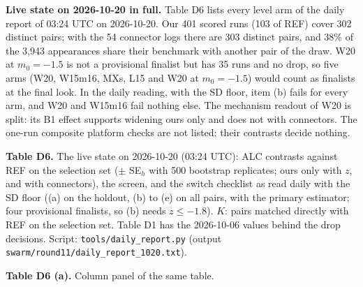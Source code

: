 \documentclass[
]{article}
\begin{document}
\textbf{Live state on 2026-10-20 in full.} Table D6 lists every level
arm of the daily report of 03:24 UTC on 2026-10-20. Our 401 scored runs
(103 of REF) cover 302 distinct pairs; with the 54 connector logs there
are 303 distinct pairs, and 38\% of the 3,943 appearances share their
benchmark with another pair of the draw. W20 at \(m_0 = -1.5\) is not a
provisional finalist but has 35 runs and no drop, so five arms (W20,
W15m16, MXs, L15 and W20 at \(m_0 = -1.5\)) would count as finalists at
the final look. In the daily reading, with the SD floor, item (b) fails
for every arm, and W20 and W15m16 fail nothing else. The mechanism
readout of W20 is split: its B1 effect supports widening ours only and
does not with connectors. The one-run composite platform checks are not
listed; their contrasts decide nothing.

\textbf{Table D6.} The live state on 2026-10-20 (03:24 UTC): ALC
contrasts against REF on the selection set (\(\pm\) SE\(_h\) with 500
bootstrap replicates; ours only with \(z\), and with connectors), the
screen, and the switch checklist as read daily with the SD floor ((a) on
the holdout, (b) to (e) on all pairs, with the primary estimator; four
provisional finalists, so (b) needs \(z \le -1.8\)). \(K\): pairs
matched directly with REF on the selection set. Table D1 has the
2026-10-06 values behind the drop decisions. Script:
\texttt{tools/daily\_report.py} (output
\texttt{swarm/round11/daily\_report\_1020.txt}).

\textbf{Table D6 (a).} Column panel of the same table.
\end{document}
